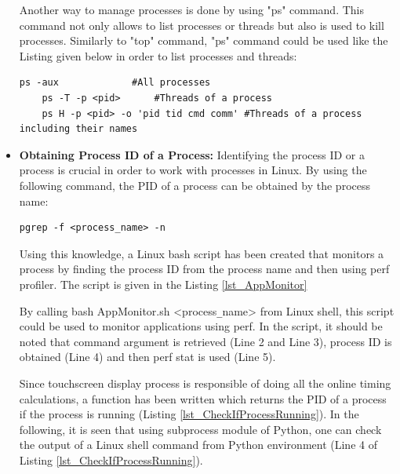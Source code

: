 \begin{itemize}
	Another way to manage processes is done by using "ps" command. This command not only allows to list processes or threads but also is used to kill processes. Similarly to "top" command, "ps" command could be used like the Listing given below in order to list processes and threads:
	\begin{lstlisting}[style=bash]
	ps -aux             #All processes
	ps -T -p <pid>      #Threads of a process
	ps H -p <pid> -o 'pid tid cmd comm' #Threads of a process including their names
	\end{lstlisting}
	
	\item \textbf{Obtaining Process ID of a Process:} Identifying the process ID or a process is crucial in order to work with processes in Linux. By using the following command, the PID of a process can be obtained by the process name:
	\begin{lstlisting}[style=bash]
		pgrep -f <process_name> -n 
	\end{lstlisting}
	Using this knowledge, a Linux bash script has been created that monitors a process by finding the process ID from the process name and then using perf profiler. The script is given in the Listing \ref{lst_AppMonitor}
	
	
	By calling bash AppMonitor.sh <process\texttt{\_}name> from Linux shell, this script could be used to monitor applications using perf. In the script, it should be noted that command argument is retrieved (Line 2 and Line 3), process ID is obtained (Line 4) and then perf stat is used (Line 5). 
	
	
	Since touchscreen display process is responsible of doing all the online timing calculations, a function has been written which returns the PID of a process if the process is running (Listing \ref{lst_CheckIfProcessRunning}). In the following, it is seen that using subprocess module of Python, one can check the output of a Linux shell command from Python environment (Line 4 of Listing \ref{lst_CheckIfProcessRunning}).
	

\end{itemize}

